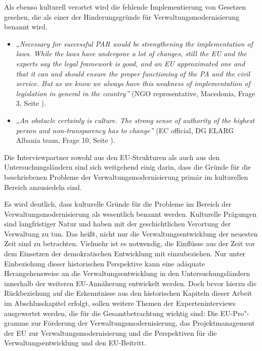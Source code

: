 Als ebenso kulturell verortet wird die fehlende Implementierung von Gesetzen gesehen, die als einer der Hinderungsgründe für Verwaltungsmodernisierung benannt wird.
\begin{itemize}[label={}]
\item \textit{„Necessary for successful PAR would be strengthening the implementation of laws. While the laws have undergone a lot of changes, still the EU and the experts say the legal framework is good, and an EU approximated one and that it can and should ensure the proper functioning of the PA and the civil service. But as we know we always have this weakness of implementation of legislation in general in the country”} (NGO representative, Macedonia, Frage 3, Seite \pageref{sec:par montenegro}).
\item \textit{„An obstacle certainly is culture. The strong sense of authority of the highest person and non-transparency has to change”} (EC official, DG ELARG Albania team, Frage 10, Seite \pageref{sec:montenegro2}).
\end{itemize}
Die Interviewpartner sowohl aus den EU-Strukturen als auch aus den Untersuchungsländern sind sich weitgehend einig darin, dass die Gründe für die beschriebenen Probleme der Verwaltungsmodernisierung primär im kulturellen Bereich anzusiedeln sind.\par
Es wird deutlich, dass kulturelle Gründe für die Probleme im Bereich der Verwaltungsmodernisierung als wesentlich benannt werden. Kulturelle Prägungen sind langfristiger Natur und haben mit der geschichtlichen Verortung der Verwaltung zu tun. Das heißt, nicht nur die Verwaltungsentwicklung der neuesten Zeit sind zu betrachten. Vielmehr ist es notwendig, die Einflüsse aus der Zeit vor dem Einsetzen der demokratischen Entwicklung mit einzubeziehen. Nur unter Einbeziehung dieser historischen Perspektive kann eine adäquate Herangehensweise an die Verwaltungsentwicklung in den Untersuchungsländern innerhalb der weiteren EU-Annäherung entwickelt werden. Doch bevor hierzu die Rückbeziehung auf die Erkenntnisse aus den historischen Kapiteln dieser Arbeit im Abschlusskapitel erfolgt, sollen weitere Themen der Experteninterviews ausgewertet werden, die für die Gesamtbetrachtung wichtig sind: Die EU-Pro"-gramme zur Förderung der Verwaltungsmodernisierung, das Projektmanagement der EU zur Verwaltungsmodernisierung und die Perspektiven für die Verwaltungsentwicklung und den EU-Beitritt.

